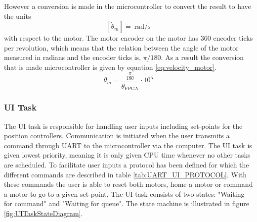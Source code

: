 \documentclass[../../main.tex]{subfiles}
\begin{document}
However a conversion is made in the microcontroller to convert the result to have the units \[ \left[ \dot{\theta}_m \right] = \SI{}{\radian \per \second } \] with respect to the motor. The motor encoder on the motor has 360 encoder ticks per revolution, which means that the relation between the angle of the motor measured in radians and the encoder ticks is, $\pi / 180$. As a result the conversion that is made microcontroller is given by equation \ref{eq:velocity_motor}.
\begin{equation}\label{eq:velocity_motor}
    \dot{\theta}_{m} = \frac{\frac{\pi}{180}}{ \dot{\theta}_{\mathrm{FPGA}} }\cdot 10^{5}
\end{equation}





\subsubsection*{UI Task}
The UI task is responsible for handling user inputs including set-points for the position controllers. Communication is initiated when the user transmits a command through UART to the microcontroller via the computer. The UI task is given lowest priority, meaning it is only given CPU time whenever no other tasks are scheduled. To facilitate user inputs a protocol has been defined for which the different commands are described in table \ref{tab:UART_UI_PROTOCOL}. With these commands the user is able to reset both motors, home a motor or command a motor to go to a given set-point. The UI-task consists of two states: "Waiting for command" and "Waiting for queue". The state machine is illustrated in figure
\ref{fig:UITaskStateDiagram}. 
\end{document}
